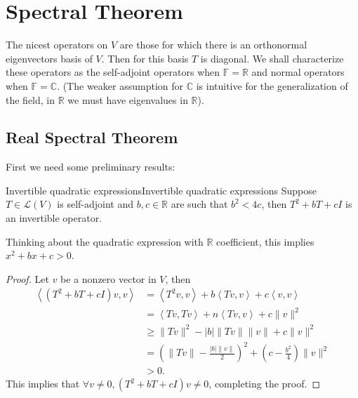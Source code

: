 \documentclass[../main.tex]{subfiles}
\begin{document}
\section{Spectral Theorem}

The nicest operators on $V$ are those for which there is an orthonormal eigenvectors basis of $V$. Then for this basis $T$ is diagonal. We shall characterize these operators as the self-adjoint operators when $\mathbb{F}=\mathbb{R}$ and normal operators when $\mathbb{F}=\mathbb{C}$. (The weaker assumption for $\mathbb{C}$ is intuitive for the generalization of the field, in $\mathbb{R}$ we must have eigenvalues in $\mathbb{R}$).

\subsection{Real Spectral Theorem}

First we need some preliminary results:
\begin{proposition}{Invertible quadratic expressions}{Invertible quadratic expressions}
Suppose $T\in \mathscr{L}(V)$ is self-adjoint and $b,c\in \mathbb{R}$ are such that $b ^2 < 4c$, then $T^2+bT+cI$ is an invertible operator.
\end{proposition}
Thinking about the quadratic expression with $\mathbb{R}$ coefficient, this implies $x^2+bx+c > 0$.
\begin{proof}
Let $v$ be a nonzero vector in $V$, then
\begin{equation*}
\begin{aligned}
	\left<(T^2+bT+cI)v,v\right> &= \left<T^2v,v\right> + b \left<Tv,v\right>+c \left<v,v\right>\\
    &= \left<Tv,Tv\right> + n \left<Tv,v\right> + c \|v\|^2\\
    &\geq \|Tv\|^2 - \left|b\right| \|Tv\| \|v\| + c \|v\|^2\\
    &= \left(\|Tv\| - \frac{\left|b\right|\|v\|}{2}\right)^2 + \left(c- \frac{b ^2}{4}\right)\|v\|^2\\
    &> 0.
\end{aligned}
\end{equation*}
This implies that $\forall v\neq 0, (T^2+bT+cI)v\neq 0$, completing the proof.
\end{proof}
\end{document}
